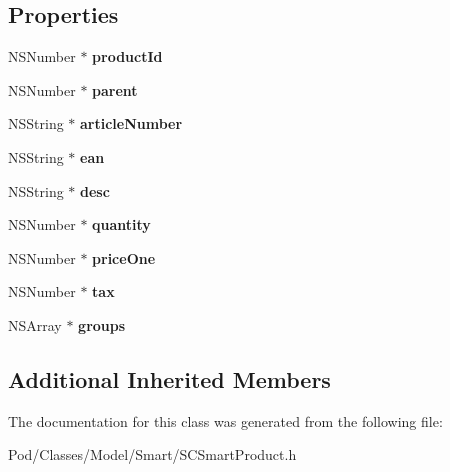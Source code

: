 \subsection*{Properties}
\begin{DoxyCompactItemize}
\item 
N\+S\+Number $\ast$ {\bfseries product\+Id}\hypertarget{interface_s_c_smart_product_a225134ce28e7ac28a137263c9fe8cb12}{}\label{interface_s_c_smart_product_a225134ce28e7ac28a137263c9fe8cb12}

\item 
N\+S\+Number $\ast$ {\bfseries parent}\hypertarget{interface_s_c_smart_product_a70d02ab9dc7c182ef6d3b723ceb16abc}{}\label{interface_s_c_smart_product_a70d02ab9dc7c182ef6d3b723ceb16abc}

\item 
N\+S\+String $\ast$ {\bfseries article\+Number}\hypertarget{interface_s_c_smart_product_a9855bdcf374fc1880547487d4fc82afe}{}\label{interface_s_c_smart_product_a9855bdcf374fc1880547487d4fc82afe}

\item 
N\+S\+String $\ast$ {\bfseries ean}\hypertarget{interface_s_c_smart_product_aee268e1cb01ba58c222d3663d36a024a}{}\label{interface_s_c_smart_product_aee268e1cb01ba58c222d3663d36a024a}

\item 
N\+S\+String $\ast$ {\bfseries desc}\hypertarget{interface_s_c_smart_product_ab2bd189777ee6b440a3e9916935d785d}{}\label{interface_s_c_smart_product_ab2bd189777ee6b440a3e9916935d785d}

\item 
N\+S\+Number $\ast$ {\bfseries quantity}\hypertarget{interface_s_c_smart_product_a0512e183c60ce43f79c1bd04b33df8b2}{}\label{interface_s_c_smart_product_a0512e183c60ce43f79c1bd04b33df8b2}

\item 
N\+S\+Number $\ast$ {\bfseries price\+One}\hypertarget{interface_s_c_smart_product_a6ee004898a2daa3604328a05b9cce7f2}{}\label{interface_s_c_smart_product_a6ee004898a2daa3604328a05b9cce7f2}

\item 
N\+S\+Number $\ast$ {\bfseries tax}\hypertarget{interface_s_c_smart_product_ab0ced13e7759da6fd66dd58cd8927719}{}\label{interface_s_c_smart_product_ab0ced13e7759da6fd66dd58cd8927719}

\item 
N\+S\+Array $\ast$ {\bfseries groups}\hypertarget{interface_s_c_smart_product_a301545d7a0875dac68c5ae446b5737ca}{}\label{interface_s_c_smart_product_a301545d7a0875dac68c5ae446b5737ca}

\end{DoxyCompactItemize}
\subsection*{Additional Inherited Members}


The documentation for this class was generated from the following file\+:\begin{DoxyCompactItemize}
\item 
Pod/\+Classes/\+Model/\+Smart/S\+C\+Smart\+Product.\+h\end{DoxyCompactItemize}
